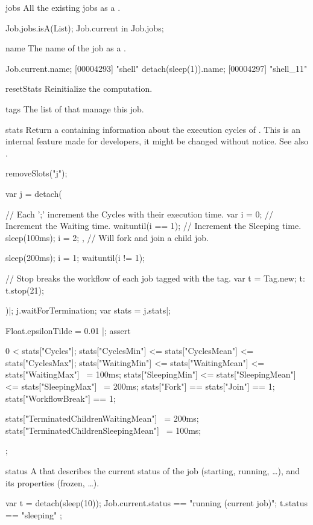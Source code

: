 \begin{urbiscriptapi}
\item[jobs]%
  All the existing jobs as a .
\begin{urbiassert}
Job.jobs.isA(List);
Job.current in Job.jobs;
\end{urbiassert}


\item[name] The name of the job as a .
\begin{urbiscript}
Job.current.name;
[00004293] "shell"
detach(sleep(1)).name;
[00004297] "shell_11"
\end{urbiscript}


\item[resetStats]%
  Reinitialize the  computation.

\item[tags] The list of  that manage this job.

\item[stats]%
  Return a  containing information about the execution
  cycles of \urbi.  This is an internal feature made for developers, it
  might be changed without notice.  See also .
\begin{urbicomment}
removeSlots("j");
\end{urbicomment}
\begin{urbiscript}
var j = detach({
  // Each ';' increment the Cycles with their execution time.
  var i = 0;
  {
    // Increment the Waiting time.
    waituntil(i == 1);
    // Increment the Sleeping time.
    sleep(100ms);
    i = 2;
  }, // Will fork and join a child job.

  sleep(200ms);
  i = 1;
  waituntil(i != 1);

  // Stop breaks the workflow of each job tagged with the tag.
  var t = Tag.new;
  t: t.stop(21);
})|;
j.waitForTermination;
var stats = j.stats|;

Float.epsilonTilde = 0.01 |;
assert
{
  0 < stats["Cycles"];
  stats["CyclesMin"] <= stats["CyclesMean"] <= stats["CyclesMax"];
  stats["WaitingMin"] <= stats["WaitingMean"] <= stats["WaitingMax"] ~= 100ms;
  stats["SleepingMin"] <= stats["SleepingMean"] <= stats["SleepingMax"] ~= 200ms;
  stats["Fork"] == stats["Join"] == 1;
  stats["WorkflowBreak"] == 1;

  stats["TerminatedChildrenWaitingMean"] ~= 200ms;
  stats["TerminatedChildrenSleepingMean"] ~= 100ms;
};
\end{urbiscript}


\item[status] A  that describes the current status of the
  job (starting, running, \ldots), and its properties (frozen, \ldots).
\begin{urbiassert}
var t = detach(sleep(10));
Job.current.status == "running (current job)";
t.status == "sleeping" ;
\end{urbiassert}



\end{urbiscriptapi}

